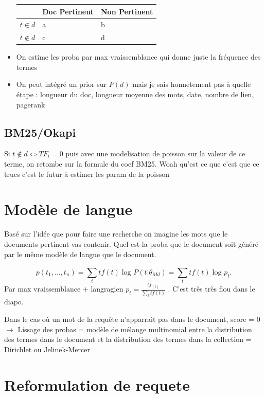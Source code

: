\documentclass{article}
\theoremstyle{plain}%
\theoremstyle{definition}
\theoremstyle{remark}
\begin{document}
\begin{itemize}
    \begin{table}[!ht]
        \centering
        \begin{tabular}{|l|l|l|}
        \hline
            ~ & Doc Pertinent & Non Pertinent \\ \hline
            $t \in d$ & a & b \\ \hline
            $t \not\in d$ & c & d \\ \hline
        \end{tabular}
    \end{table}
    \item On estime les proba par max vraissemblance qui donne juste la fréquence des termes
    \item On peut intégré un prior sur $ P(d) $ mais je sais honnetement pas à quelle étape : longueur du doc, longueur moyenne des mots, date, nombre de lien, pagerank
\end{itemize}

\subsection{BM25/Okapi}
Si $ t \not\in d \Leftrightarrow TF_t = 0 $ puis avec une modelisation de poisson sur la valeur de ce terme, on retombe sur la formule du coef BM25. Woah qu'est ce que c'est que ce trucs c'est le futur à estimer les param de la poisson

\section{Modèle de langue }
Basé sur l'idée que pour faire une recherche on imagine les mots que le documents pertinent vas contenir. Quel est la proba que le document soit généré par le même modèle de langue que le document.

\[
    p(t_1, \dots, t_n) = \sum_{t}^{}tf(t)\log_{} P(t | \theta _{Md}) = \sum_{t}^{}tf(t)\log_{} p_t
.\]
Par max vraissemblance + langragien  $ p_t = \frac{tf_(t)}{\sum_{t}^{}tf(t)} $ . C'est très très flou dans le diapo.

Dans le cas où un mot de la requête n'apparrait pas dans le document, score = 0 $\rightarrow$ Lissage des probas = modèle de
mélange multinomial entre la distribution des termes dans le
document et la distribution des termes dans la collection = Dirichlet ou Jelinek-Mercer

\section{Reformulation de requete}
\end{document}
